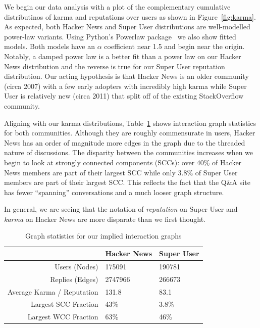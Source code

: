 \documentclass[10pt]{article}
\begin{document}
We begin our data analysis with a plot of the complementary cumulative
distributinos of karma and reputations 
over users as shown in Figure~\ref{fig:karma}. As expected, both Hacker News
and Super User distributions are well-modelled power-law variants. Using 
Python's Powerlaw package~\cite{alstott_powerlaw:_2013} we also show fitted
models. Both models have an $\alpha$ coefficient near 1.5 and begin near
the origin. Notably, a damped power law is a better fit than
a power law on our Hacker News distribution and the reverse is true for
our Super User reputation distribution. Our acting hypothesis is that
Hacker News is an older community (circa 2007) with a few early adopters with incredibly
high karma while Super User is relatively new (circa 2011) that split off
of the existing StackOverflow community. 

Aligning with our karma distributions, Table~\ref{tab:graphstats} shows
interaction graph statistics for both communities. Although they are roughly
commensurate in users, Hacker News has an order of magnitude more edges in the
graph due to the threaded nature of discussions. The disparity between the
communities increases when we begin to look at strongly connected components
(SCCs): over 40\% of Hacker News members are part of their largest SCC while only
3.8\% of Super User members are part of their largest SCC. This reflects the
fact that the Q\&A site has fewer ``spanning'' conversations and a much looser
graph structure. 

In general, we are seeing that the notation of \textit{reputation} on
Super User and \textit{karma} on Hacker News are more disparate than we first
thought.

\begin{table}[h]
\begin{center}
\begin{tabular}{| r | l l |}
\hline
& \textbf{Hacker News} & \textbf{Super User} \\
\hline
Users (Nodes) & 175091 & 190781 \\
Replies (Edges) & 2747966 & 266673 \\
Average Karma / Reputation & 131.8 & 83.1 \\
Largest SCC Fraction & 43\% & 3.8\% \\
Largest WCC Fraction & 63\% & 46\% \\
\hline
\end{tabular}
\end{center}
\caption{Graph statistics for our implied interaction graphs}
\label{tab:graphstats}
\end{table}
\end{document}
